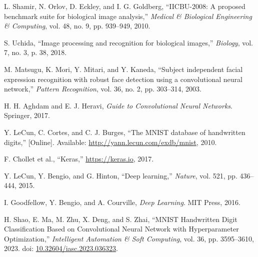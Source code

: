 \documentclass[conference]{IEEEtran}
\begin{document}

\begin{thebibliography}{00}

L. Shamir, N. Orlov, D. Eckley, and I. G. Goldberg, ``IICBU-2008: A proposed benchmark suite for biological image analysis,'' \emph{Medical \& Biological Engineering \& Computing}, vol. 48, no. 9, pp. 939--949, 2010.

S. Uchida, ``Image processing and recognition for biological images,'' \emph{Biology}, vol. 7, no. 3, p. 38, 2018.

M. Matsugu, K. Mori, Y. Mitari, and Y. Kaneda, ``Subject independent facial expression recognition with robust face detection using a convolutional neural network,'' \emph{Pattern Recognition}, vol. 36, no. 2, pp. 303--314, 2003.

H. H. Aghdam and E. J. Heravi, \emph{Guide to Convolutional Neural Networks}. Springer, 2017.

Y. LeCun, C. Cortes, and C. J. Burges, ``The MNIST database of handwritten digits,'' [Online]. Available: \url{http://yann.lecun.com/exdb/mnist}, 2010.

F. Chollet et al., 
“Keras,” 
\url{https://keras.io}, 2017.

Y. LeCun, Y. Bengio, and G. Hinton, ``Deep learning,'' \emph{Nature}, vol. 521, pp. 436--444, 2015.

I. Goodfellow, Y. Bengio, and A. Courville, \textit{Deep Learning}. MIT Press, 2016.

H. Shao, E. Ma, M. Zhu, X. Deng, and S. Zhai, ``MNIST Handwritten Digit Classification Based on Convolutional Neural Network with Hyperparameter Optimization,'' \emph{Intelligent Automation \& Soft Computing}, vol. 36, pp. 3595–3610, 2023. doi: \href{https://doi.org/10.32604/iasc.2023.036323}{10.32604/iasc.2023.036323}.

\end{thebibliography}
\end{document}
